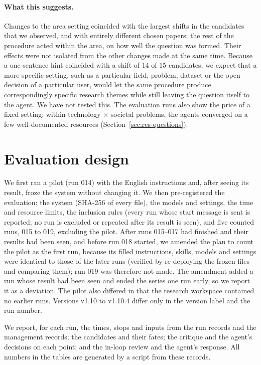 \documentclass[11pt]{article}
\begin{document}
\paragraph{What this suggests.} Changes to the area setting coincided with the largest shifts in the candidates that we observed, and with entirely different chosen papers; the rest of the procedure acted within the area, on how well the question was formed. Their effects were not isolated from the other changes made at the same time. Because a one-sentence hint coincided with a shift of 14 of 15 candidates, we expect that a more specific setting, such as a particular field, problem, dataset or the open decision of a particular user, would let the same procedure produce correspondingly specific research themes while still leaving the question itself to the agent. We have not tested this. The evaluation runs also show the price of a fixed setting: within technology $\times$ societal problems, the agents converged on a few well-documented resources (Section~\ref{sec:res-questions}).

\section{Evaluation design}
\label{sec:design}

We first ran a pilot (run 014) with the English instructions and, after seeing its result, froze the system without changing it. We then pre-registered the evaluation: the system (SHA-256 of every file), the models and settings, the time and resource limits, the inclusion rules (every run whose start message is sent is reported; no run is excluded or repeated after its result is seen), and five counted runs, 015 to 019, excluding the pilot. After runs 015--017 had finished and their results had been seen, and before run 018 started, we amended the plan to count the pilot as the first run, because its filled instructions, skills, models and settings were identical to those of the later runs (verified by re-deploying the frozen files and comparing them); run 019 was therefore not made. The amendment added a run whose result had been seen and ended the series one run early, so we report it as a deviation. The pilot also differed in that the research workspace contained no earlier runs. Versions v1.10 to v1.10.4 differ only in the version label and the run number.

We report, for each run, the times, stops and inputs from the run records and the management records; the candidates and their fates; the critique and the agent's decisions on each point; and the in-loop review and the agent's response. All numbers in the tables are generated by a script from these records.
\end{document}
